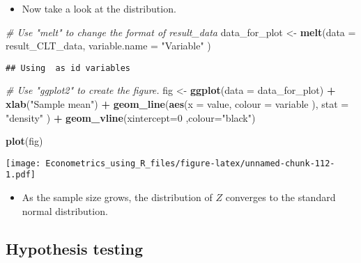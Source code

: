 \documentclass[]{book}
\newenvironment{Shaded}{\begin{snugshade}}{\end{snugshade}}
\newcommand{\CommentTok}[1]{\textcolor[rgb]{0.56,0.35,0.01}{\textit{#1}}}
\newcommand{\DataTypeTok}[1]{\textcolor[rgb]{0.13,0.29,0.53}{#1}}
\newcommand{\DecValTok}[1]{\textcolor[rgb]{0.00,0.00,0.81}{#1}}
\newcommand{\KeywordTok}[1]{\textcolor[rgb]{0.13,0.29,0.53}{\textbf{#1}}}
\newcommand{\NormalTok}[1]{#1}
\newcommand{\OperatorTok}[1]{\textcolor[rgb]{0.81,0.36,0.00}{\textbf{#1}}}
\newcommand{\StringTok}[1]{\textcolor[rgb]{0.31,0.60,0.02}{#1}}
\providecommand{\tightlist}{%
  \setlength{\itemsep}{0pt}\setlength{\parskip}{0pt}}
\begin{document}
\begin{itemize}
\tightlist
\item
  Now take a look at the distribution.
\end{itemize}

\begin{Shaded}
\begin{Highlighting}[]
\CommentTok{# Use "melt" to change the format of result_data}
\NormalTok{data_for_plot <-}\StringTok{ }\KeywordTok{melt}\NormalTok{(}\DataTypeTok{data =}\NormalTok{ result_CLT_data, }\DataTypeTok{variable.name =} \StringTok{"Variable"}\NormalTok{ )}
\end{Highlighting}
\end{Shaded}

\begin{verbatim}
## Using  as id variables
\end{verbatim}

\begin{Shaded}
\begin{Highlighting}[]
\CommentTok{# Use "ggplot2" to create the figure.}
\NormalTok{fig <-}\StringTok{ }
\StringTok{  }\KeywordTok{ggplot}\NormalTok{(}\DataTypeTok{data =}\NormalTok{ data_for_plot) }\OperatorTok{+}
\StringTok{  }\KeywordTok{xlab}\NormalTok{(}\StringTok{"Sample mean"}\NormalTok{) }\OperatorTok{+}\StringTok{ }
\StringTok{  }\KeywordTok{geom_line}\NormalTok{(}\KeywordTok{aes}\NormalTok{(}\DataTypeTok{x =}\NormalTok{ value, }\DataTypeTok{colour =}\NormalTok{ variable ),   }\DataTypeTok{stat =} \StringTok{"density"}\NormalTok{ ) }\OperatorTok{+}\StringTok{ }
\StringTok{  }\KeywordTok{geom_vline}\NormalTok{(}\DataTypeTok{xintercept=}\DecValTok{0}\NormalTok{ ,}\DataTypeTok{colour=}\StringTok{"black"}\NormalTok{)}

\KeywordTok{plot}\NormalTok{(fig)}
\end{Highlighting}
\end{Shaded}

\texttt{[image: Econometrics\_using\_R\_files/figure-latex/unnamed-chunk-112-1.pdf]}

\begin{itemize}
\tightlist
\item
  As the sample size grows, the distribution of \(Z\) converges to the standard normal distribution.
\end{itemize}

\hypertarget{hypothesis-testing-1}{%
\subsection{Hypothesis testing}\label{hypothesis-testing-1}}
\end{document}

